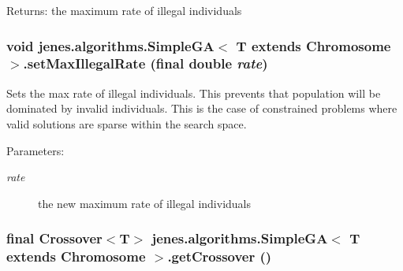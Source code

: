 \begin{Desc}
\item[Returns:]the maximum rate of illegal individuals \end{Desc}
\hypertarget{classjenes_1_1algorithms_1_1_simple_g_a_3_01_t_01extends_01_chromosome_01_4_4051bc6ee99fe2450c9dbad64c7ab594}{
\subsubsection[setMaxIllegalRate]{\setlength{\rightskip}{0pt plus 5cm}void jenes.algorithms.SimpleGA$<$ T extends Chromosome $>$.setMaxIllegalRate (final double {\em rate})}}
\label{classjenes_1_1algorithms_1_1_simple_g_a_3_01_t_01extends_01_chromosome_01_4_4051bc6ee99fe2450c9dbad64c7ab594}


Sets the max rate of illegal individuals. This prevents that population will be dominated by invalid individuals. This is the case of constrained problems where valid solutions are sparse within the search space.

\begin{Desc}
\item[Parameters:]
\begin{description}
\item[{\em rate}]the new maximum rate of illegal individuals \end{description}
\end{Desc}
\hypertarget{classjenes_1_1algorithms_1_1_simple_g_a_3_01_t_01extends_01_chromosome_01_4_3411f8691495bdd8e3818f8ee6fcc181}{
\subsubsection[getCrossover]{\setlength{\rightskip}{0pt plus 5cm}final Crossover$<$T$>$ jenes.algorithms.SimpleGA$<$ T extends Chromosome $>$.getCrossover ()}}
\label{classjenes_1_1algorithms_1_1_simple_g_a_3_01_t_01extends_01_chromosome_01_4_3411f8691495bdd8e3818f8ee6fcc181}


